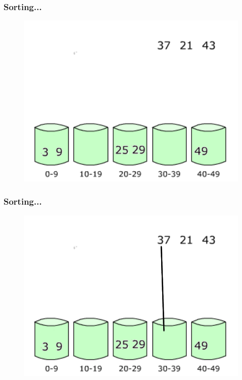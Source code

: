 \documentclass[pdf]{beamer}
\begin{document}
\begin{frame}
	\frametitle{Sorting...}
	\begin{figure}
		\includegraphics[scale=.3]{Figure/10.png}
	\end{figure}	
\end{frame}

\begin{frame}
	\frametitle{Sorting...}
	\begin{figure}
		\includegraphics[scale=.3]{Figure/11.png}
	\end{figure}	
\end{frame}
\end{document}
